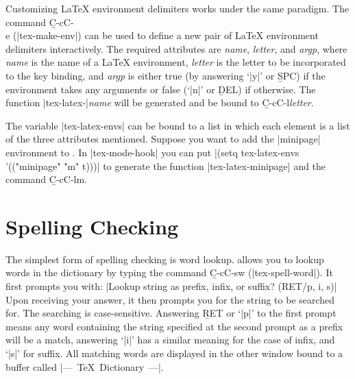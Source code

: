 {\begin{env}
\begin{minipage}
Customizing {\LaTeX} environment delimiters works under the same
paradigm.  The command {\b C-c{\s}C-\\{\s}e} (|tex-make-env|) can
be used to define a new pair of {\LaTeX} environment delimiters
interactively.  The required attributes are {\it name\/}, {\it letter\/},
and {\it argp\/}, where {\it name\/} is the name of a {\LaTeX} environment,
{\it letter\/} is the letter to be incorporated to the key binding, and
{\it argp\/} is either true (by answering `|y|' or {\b SPC}) if the
environment takes any arguments or false (`|n|' or {\b DEL})
if otherwise.  The function |tex-latex-|{\it name\/} will be generated
and be bound to {\b C-c{\s}C-l{\s}}{\it letter\/}.

The variable |tex-latex-envs| can be bound to a list in which each element
is a list of the three attributes mentioned.  Suppose you want to
add the |minipage| environment to {\TM}.  In \hbox{|tex-mode-hook|} you can
put
\begindisplay
|(setq tex-latex-envs '(("minipage" "m" t)))|\cr
\enddisplay
to generate the function |tex-latex-minipage| and the command
{\b C-c{\s}C-l{\s}m}.


\section{Spelling Checking}

\noindent
The simplest form of spelling checking is word lookup.
{\TM} allows you to lookup words in the dictionary by typing
the command {\b C-c{\s}C-s{\s}w} (|tex-spell-word|).  It first prompts you with:
\begindisplay
|Lookup string as prefix, infix, or suffix? (RET/p, i, s)|\cr
\enddisplay
Upon receiving your answer, it then prompts you for the string to be searched
for.  The searching is case-sensitive.
Answering {\b RET} or `|p|' to the first prompt means any word containing the
string specified at the second prompt as a prefix will be a match, answering 
`|i|' has a similar meaning for the case of infix, and `|s|' for suffix.
All matching words are displayed in the other window bound to a buffer called
\hbox{|--- TeX Dictionary ---|}.


\end{minipage}
\end{env}}
